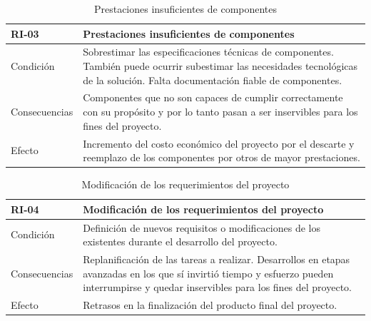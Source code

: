 \begin{table}[H]
\centering
\begin{tabular} {|m{2.5cm}|m{11.5cm}|}
    \hline \rowcolor{test_header_color}
    RI-03 & Prestaciones insuficientes de componentes \\
    \hline
        Condición & Sobrestimar las especificaciones técnicas de componentes. También puede ocurrir subestimar las necesidades tecnológicas de la solución. Falta documentación fiable de componentes. \\
    \hline
        Consecuencias & Componentes que no son capaces de cumplir correctamente con su propósito y por lo tanto pasan a ser inservibles para los fines del proyecto. \\
    \hline
        Efecto & Incremento del costo económico del proyecto por el descarte y reemplazo de los componentes por otros de mayor prestaciones. \\
    \hline
\end{tabular}
\caption{Prestaciones insuficientes de componentes}
\end{table}

\begin{table}[H]
\centering
\begin{tabular} {|m{2.5cm}|m{11.5cm}|}
    \hline \rowcolor{test_header_color}
    RI-04 & Modificación de los requerimientos del proyecto \\
    \hline
        Condición & Definición de nuevos requisitos o modificaciones de los existentes durante el desarrollo del proyecto. \\
    \hline
        Consecuencias & Replanificación de las tareas a realizar. Desarrollos en etapas avanzadas en los que sí invirtió tiempo y esfuerzo pueden interrumpirse y quedar inservibles para los fines del proyecto. \\
    \hline
        Efecto & Retrasos en la finalización del producto final del proyecto. \\
    \hline
\end{tabular}
\caption{Modificación de los requerimientos del proyecto}
\end{table}

